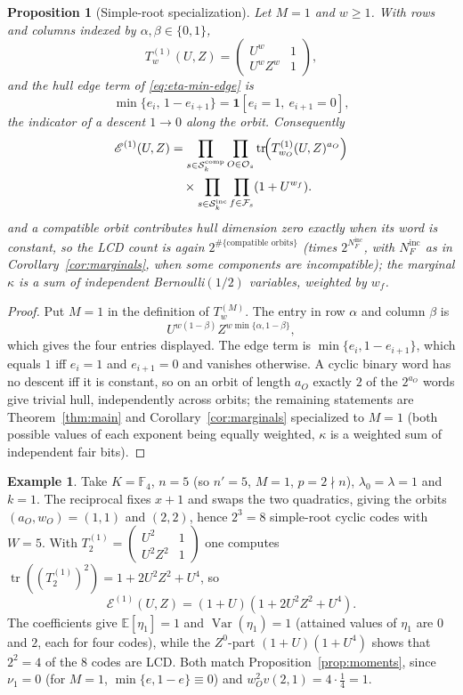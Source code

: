 \documentclass[preprint,12pt,a4paper]{elsarticle}
\newcommand{\F}{\mathbb F}
\newcommand{\Fs}{\mathcal F_s}
\newcommand{\Os}{\mathcal O_s}
\newcommand{\Epoly}{\mathscr E}
\newtheorem{proposition}[theorem]{Proposition}
\theoremstyle{definition}
\newtheorem{example}[theorem]{Example}
\theoremstyle{remark}
\begin{document}
\begin{proposition}[Simple-root specialization]\label{prop:M1}
Let $M=1$ and $w\geq1$. With rows and columns indexed by $\alpha,\beta\in\{0,1\}$,
\[
T^{(1)}_w(U,Z)=
\begin{pmatrix}
U^{w} & 1\\[2pt]
U^{w}Z^{w} & 1
\end{pmatrix},
\]
and the hull edge term of \eqref{eq:eta-min-edge} is
\[
\min\{e_i,\,1-e_{i+1}\}=\mathbf{1}[e_i=1,\ e_{i+1}=0],
\]
the indicator of a \emph{descent} $1\to0$ along the orbit. Consequently
\[
\begin{aligned}
\Epoly^{(1)}(U,Z)
&=\prod_{s\in\mathcal{S}_k^{\mathrm{comp}}}
  \prod_{O\in\Os}
  \operatorname{tr}\!\Bigl(
  T^{(1)}_{w_O}(U,Z)^{a_O}
  \Bigr)\\
&\quad\times
  \prod_{s\in\mathcal{S}_k^{\mathrm{inc}}}
  \prod_{f\in\Fs}
  (1+U^{w_f}).
\end{aligned}
\]
and a compatible orbit contributes hull dimension zero exactly when its word is
constant, so the LCD count is again $2^{\#\{\text{compatible orbits}\}}$ (times
$2^{N_F^{\mathrm{inc}}}$, with $N_F^{\mathrm{inc}}$ as in
Corollary~\ref{cor:marginals}, when some components are incompatible); the
marginal $\kappa$ is a sum of independent Bernoulli$(1/2)$ variables, weighted
by $w_f$.
\end{proposition}

\begin{proof}
Put $M=1$ in the definition of $T^{(M)}_w$. The entry in row $\alpha$ and
column $\beta$ is
\[
U^{w(1-\beta)}Z^{w\min\{\alpha,1-\beta\}},
\]
which gives the four entries displayed. The edge term is
$\min\{e_i,1-e_{i+1}\}$, which equals $1$ iff $e_i=1$ and $e_{i+1}=0$ and
vanishes otherwise. A cyclic binary word has no descent iff it is constant, so
on an orbit of length $a_O$ exactly $2$ of the $2^{a_O}$ words give trivial
hull, independently across orbits; the remaining statements are
Theorem~\ref{thm:main} and Corollary~\ref{cor:marginals} specialized to $M=1$
(both possible values of each exponent being equally weighted, $\kappa$ is a
weighted sum of independent fair bits).
\end{proof}

\begin{example}\label{ex:M1}
Take $K=\F_4$, $n=5$ (so $n'=5$, $M=1$, $p=2\nmid n$), $\lambda_0=\lambda=1$
and $k=1$. The reciprocal fixes $x+1$ and swaps the two quadratics, giving the
orbits $(a_O,w_O)=(1,1)$ and $(2,2)$, hence $2^3=8$ simple-root cyclic codes
with $W=5$. With
$T^{(1)}_2=\begin{pmatrix}U^2&1\\ U^2Z^2&1\end{pmatrix}$ one computes
$\operatorname{tr}((T^{(1)}_2)^2)=1+2U^2Z^2+U^4$, so
\[
\Epoly^{(1)}(U,Z)=(1+U)(1+2U^2Z^2+U^4).
\]
The coefficients give $\mathbb{E}[\eta_1]=1$ and $\operatorname{Var}(\eta_1)=1$
(attained values of $\eta_1$ are $0$ and $2$, each for four codes), while the
$Z^0$-part $(1+U)(1+U^4)$ shows that $2^2=4$ of the $8$ codes are LCD. Both
match Proposition~\ref{prop:moments}, since $\nu_1=0$ (for $M=1$,
$\min\{e,1-e\}\equiv0$) and $w_O^2v(2,1)=4\cdot\tfrac14=1$.
\end{example}
\end{document}
